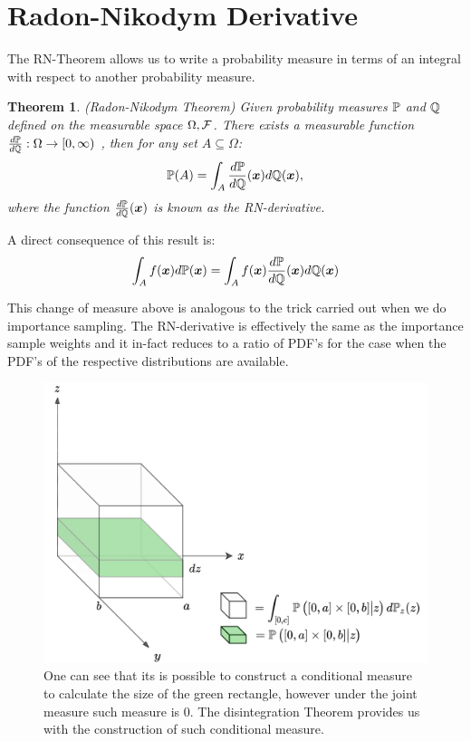\documentclass[a4paper,12pt,twoside,openright]{report}
\newtheorem{theorem}{Theorem}
\theoremstyle{definition}
\begin{document}
\section{Radon-Nikodym Derivative}

The RN-Theorem allows us to write a probability measure in terms of an integral with respect to another probability measure. 

\begin{theorem}
(Radon-Nikodym Theorem)
Given probability measures $\P$ and $\Q$ defined on the measurable space $\Omega, \calF$. There exists a measurable function $\frac{d\P}{d\Q}:\Omega \rightarrow [0, \infty)$ , then for any  set $A \subseteq  \Omega$:
\begin{align}
    \P(A) = \int_{A} \frac{d\P}{d\Q}(\vx) d\Q(\vx),
\end{align}
where the function $\frac{d\P}{d\Q}(\vx)$ is known as the RN-derivative.
\end{theorem}

A direct consequence of this result is:
\begin{align*}
    \int_A f(\vx) d\P(\vx) =  \int_{A} f(\vx)  \frac{d\P}{d\Q}(\vx)  d\Q(\vx)
\end{align*}

This change of measure above is analogous to the trick carried out when we do importance sampling. The RN-derivative is effectively the same as the importance sample weights and it in-fact reduces to a ratio of PDF's for the case when the PDF's of the respective distributions are available.
\begin{figure}[t!]
    \centering
    \includegraphics[scale=0.5]{images/disint2.png}
    \caption{ One can see that its is possible to construct a conditional measure to calculate the size of the green rectangle, however under the joint measure such measure is $0$. The disintegration Theorem provides us with the construction of such conditional measure.}
    \label{fig:disintegration}
\end{figure}
\end{document}
